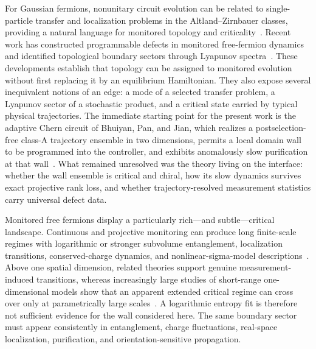\documentclass[aps,prx,twocolumn,superscriptaddress,longbibliography,nofootinbib,floatfix]{revtex4-2}
\begin{document}
For Gaussian fermions, nonunitary circuit evolution can be related to single-particle transfer and localization problems in the Altland--Zirnbauer classes, providing a natural language for monitored topology and criticality~\cite{Jian2022,Kells2023}.  Recent work has constructed programmable defects in monitored free-fermion dynamics and identified topological boundary sectors through Lyapunov spectra~\cite{PanShapourianJian2025,Oshima2025,XiaoKawabata2026}.  These developments establish that topology can be assigned to monitored evolution without first replacing it by an equilibrium Hamiltonian.  They also expose several inequivalent notions of an edge: a mode of a selected transfer problem, a Lyapunov sector of a stochastic product, and a critical state carried by typical physical trajectories.  The immediate starting point for the present work is the adaptive Chern circuit of Bhuiyan, Pan, and Jian, which realizes a postselection-free class-A trajectory ensemble in two dimensions, permits a local domain wall to be programmed into the controller, and exhibits anomalously slow purification at that wall~\cite{BhuiyanPanJian2026}.  What remained unresolved was the theory living on the interface: whether the wall ensemble is critical and chiral, how its slow dynamics survives exact projective rank loss, and whether trajectory-resolved measurement statistics carry universal defect data.

Monitored free fermions display a particularly rich---and subtle---critical landscape.  Continuous and projective monitoring can produce long finite-scale regimes with logarithmic or stronger subvolume entanglement, localization transitions, conserved-charge dynamics, and nonlinear-sigma-model descriptions~\cite{CaoTilloyDeLuca2019,AlbertonBuchholdDiehl2021,FavaPiroliSwann2023,FavaPiroliBernard2024,PoboikoPopperlGornyi2023}.  Above one spatial dimension, related theories support genuine measurement-induced transitions, whereas increasingly large studies of short-range one-dimensional models show that an apparent extended critical regime can cross over only at parametrically large scales~\cite{PoboikoGornyiMirlin2024,NiedereggerVovkStarchl2026}.  A logarithmic entropy fit is therefore not sufficient evidence for the wall considered here.  The same boundary sector must appear consistently in entanglement, charge fluctuations, real-space localization, purification, and orientation-sensitive propagation.
\end{document}
